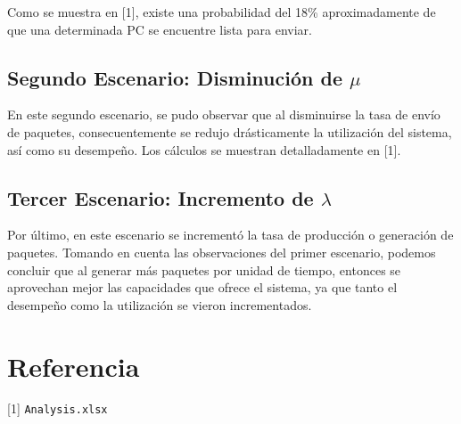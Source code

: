 \documentclass[12pt,letterpaper,oneside]{article}
\begin{document}
      Como se muestra en [1], existe una probabilidad del 18\% aproximadamente de que una determinada PC se encuentre lista para enviar.
      
      \subsection{Segundo Escenario: Disminución de $\mu$}
      En este segundo escenario, se pudo observar que al disminuirse la tasa de envío de paquetes, consecuentemente se redujo drásticamente la utilización del sistema, así como su desempeño. Los cálculos se muestran detalladamente en [1].
      
      \subsection{Tercer Escenario: Incremento de $\lambda$}
      Por último, en este escenario se incrementó la tasa de producción o generación de paquetes. Tomando en cuenta las observaciones del primer escenario, podemos concluir que al generar más paquetes por unidad de tiempo, entonces se aprovechan mejor las capacidades que ofrece el sistema, ya que tanto el desempeño como la utilización se vieron incrementados.
    
    \section{Referencia}
      [1] \texttt{Analysis.xlsx}
  
\end{document}
